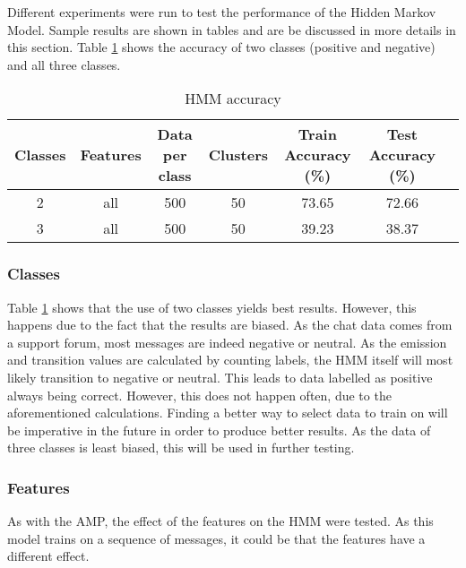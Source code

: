 
\begin{comment}
Experiments / Empirical evaluation (roughly 2-3 pages)
• Any details about experiments (dataset sizes, parameter selection, etc)
• Results
• Analysis (discussion of results / visualization / findings / etc)
\end{comment}

Different experiments were run to test the performance of the Hidden Markov Model. Sample results are shown in tables and are be discussed in more details in this section. Table \ref{table:HMMaccuracy} shows the accuracy of two classes (positive and negative) and all three classes. 
\begin{table}[h!]
\begin{center}
\begin{tabular}{| c | c | c | c | c | c | c |}
\hline
 {\textbf{Classes}} 			& {\textbf{Features}} 
 & {\textbf{Data per class}} 					& {\textbf{Clusters}} 
 & {\textbf{Train Accuracy (\%)}} 					& {\textbf{Test Accuracy (\%)}} 
 \\
\hline
2 			& all 				& 500 		& 50			& 73.65		& 72.66 		\\ %
3 			& all 				& 500 		& 50			& 39.23		& 38.37 		\\
\hline
\end{tabular}
\caption{HMM accuracy}
\label{table:HMMaccuracy}
\end{center}
\end{table}

\subsubsection*{Classes} 
Table \ref{table:HMMaccuracy} shows that the use of two classes yields best results. However, this happens due to the fact that the results are biased. As the chat data comes from a support forum, most messages are indeed negative or neutral. As the emission and transition values are calculated by counting labels, the HMM itself will most likely transition to negative or neutral. This leads to data labelled as positive always being correct. However, this does not happen often, due to the aforementioned calculations. Finding a better way to select data to train on will be imperative in the future in order to produce better results. As the data of three classes is least biased, this will be used in further testing.

\subsubsection*{Features}
As with the AMP, the effect of the features on the HMM were tested. As this model trains on a sequence of messages, it could be that the features have a different effect.

